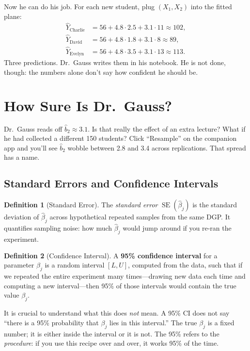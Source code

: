 \documentclass[11pt,a4paper]{article}
\theoremstyle{definition}
\newtheorem{definition}{Definition}[section]
\theoremstyle{plain}
\theoremstyle{remark}
\newcommand{\se}{\operatorname{SE}}
\newcommand{\bhat}{\hat{\beta}}
\begin{document}
Now he can do his job. For each new student, plug $(X_1, X_2)$ into the fitted plane:
\begin{align*}
  \hat{Y}_{\text{Charlie}} &= 56 + 4.8 \cdot 2.5 + 3.1 \cdot 11 \approx 102, \\
  \hat{Y}_{\text{David}}   &= 56 + 4.8 \cdot 1.8 + 3.1 \cdot 8  \approx 89, \\
  \hat{Y}_{\text{Evelyn}}  &= 56 + 4.8 \cdot 3.5 + 3.1 \cdot 13 \approx 113.
\end{align*}
Three predictions. Dr.\ Gauss writes them in his notebook. He is not done, though: the numbers alone don't say how confident he should be.

\section{How Sure Is Dr.\ Gauss?}\label{sec:uncertainty}

Dr.\ Gauss reads off $\hat b_2 \approx 3.1$. Is that really the effect of an extra lecture? What if he had collected a different 150 students? Click ``Resample'' on the companion app and you'll see $\hat b_2$ wobble between 2.8 and 3.4 across replications. That spread has a name.

\subsection{Standard Errors and Confidence Intervals}\label{subsec:ci}

\begin{definition}[Standard Error]
The \emph{standard error} $\se(\bhat_j)$ is the standard deviation of $\bhat_j$ across hypothetical repeated samples from the same DGP. It quantifies sampling noise: how much $\bhat_j$ would jump around if you re-ran the experiment.
\end{definition}

\begin{definition}[Confidence Interval]\label{def:ci}
A \textbf{95\% confidence interval} for a parameter $\beta_j$ is a random interval $[L, U]$, computed from the data, such that if we repeated the entire experiment many times---drawing new data each time and computing a new interval---then 95\% of those intervals would contain the true value $\beta_j$.
\end{definition}

It is crucial to understand what this does \emph{not} mean. A 95\% CI does not say ``there is a 95\% probability that $\beta_j$ lies in this interval.'' The true $\beta_j$ is a fixed number; it is either inside the interval or it is not. The 95\% refers to the \emph{procedure}: if you use this recipe over and over, it works 95\% of the time.
\end{document}
